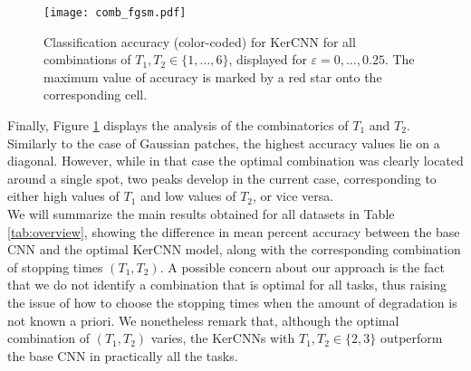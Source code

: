 \documentclass[11pt,oneside,reqno]{amsart}
\begin{document}
  \begin{figure}[htbp!]
  \centering
 \texttt{[image: comb\_fgsm.pdf]}
 \caption{Classification accuracy (color-coded) for KerCNN for all combinations of $T_1, T_2 \in \{1,\ldots,6\}$, displayed for $\varepsilon=0,\ldots,0.25$. The maximum value of accuracy is marked by a red star onto the corresponding cell.}\label{comb_fgsm}
 \end{figure}
 Finally, Figure \ref{comb_fgsm} displays the analysis of the combinatorics of $T_1$ and $T_2$. Similarly to the case of Gaussian patches, the highest accuracy values lie on a diagonal. However, while in that case the optimal combination was clearly located around a single spot, two peaks develop in the current case, corresponding to either high values of $T_1$ and low values of $T_2$, or vice versa.\\

We will summarize the main results obtained for all datasets in Table \ref{tab:overview}, showing the difference in mean percent accuracy between the base CNN and the optimal KerCNN model, along with the corresponding combination of stopping times $(T_1,T_2)$. A possible concern about our approach is the fact that we do not identify a combination that is optimal for all tasks, thus raising the issue of how to choose the stopping times when the amount of degradation is not known a priori. We nonetheless remark that, although the optimal combination of $(T_1,T_2)$ varies, the KerCNNs with $T_1, T_2 \in \{2,3\}$ outperform the base CNN in practically all the tasks.
 
 \FloatBarrier
 
\end{document}
